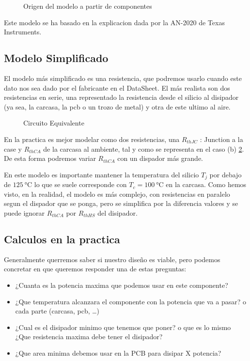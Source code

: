 \begin{figure}[H]
    \centering
    
    \caption{Origen del modelo a partir de componentes}
    \label{fig:ThermalModelOrigin}
\end{figure}

Este modelo se ha basado en la explicacion dada por la AN-2020\cite{TiAN2020} de Texas Instruments.

\subsection{Modelo Simplificado}
El modelo más simplificado es una resistencia, que podremos usarlo cuando este dato nos sea dado
por el fabricante en el DataSheet.
El más realista son dos resistencias en serie, una representado la resistencia desde el silicio al
disipador (ya sea, la carcasa, la pcb o un trozo de metal) y otra de este ultimo al aire.



\begin{figure}[H]
    \centering
    
    \caption{Circuito Equivalente}
    \label{fig:ThermalEquivalent}
\end{figure}

En la practica es mejor modelar como dos resistencias, una $R_{thJC}$ :
Junction a la case y $R_{thCA}$ de la
carcasa al ambiente, tal y como se representa en el caso (b) \ref{fig:ThermalEquivalent}.
De esta forma podremos variar $R_{thCA}$ con un dispador más grande.

En este modelo es importante mantener la temperatura del silicio $T_j$ por debajo de
$\SI{125}{\celsius}$ lo que se suele corresponde con $T_c=\SI{100}{\celsius}$ en la carcasa.
Como hemos visto, en la realidad, el modelo es más complejo, con resistencias en paralelo segun el dispador
que se ponga, pero se simplifica por la diferencia valores y se puede ignorar $R_{thCA}$
por $R_{thHS}$ del disipador.


\subsection{Calculos en la practica}
Generalmente querremos saber si nuestro diseño es viable, pero podemos concretar
en que queremos responder una de estas preguntas:
\begin{itemize}
    \item ¿Cuanta es la potencia maxima que podemos usar en este componente?
    \item ¿Que temperatura alcanzara el componente con la potencia que va a pasar?
          o cada parte (carcasa, pcb, \dots)
    \item ¿Cual es el disipador minimo que tenemos que poner? o que es lo mismo
          ¿Que resistencia maxima debe tener el disipador?
    \item ¿Que area minima debemos usar en la PCB para disipar X potencia?
\end{itemize}


